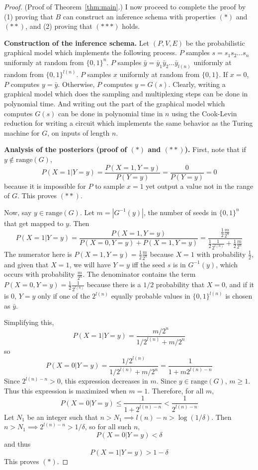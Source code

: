 \documentclass{article}
\theoremstyle{definition}
\theoremstyle{remark}
\begin{document}
\begin{proof}{(Proof of Theorem~\ref{thm:main}.)}
I now proceed to complete the proof by (1) proving that $B$ can construct an inference schema with properties $(*)$ and $(**)$, and (2) proving that $(***)$ holds.

\medskip
\noindent \textbf{Construction of the inference schema.}
Let $(P, V, E)$ be the probabilistic graphical model which implements the following process.
$P$ samples $s = s_1 s_2 \dots s_n$ uniformly at random from $\{0, 1\}^n$.
$P$ samples $\bar{y} = \bar{y}_1 \bar{y}_2 \dots \bar{y}_{l(n)}$ uniformly at random from $\{0, 1\}^{l(n)}$.
$P$ samples $x$ uniformly at random from $\{0, 1\}$.
If $x = 0$, $P$ computes $y = \bar{y}$.
Otherwise, $P$ computes $y = G(s)$.
Clearly, writing a graphical model which does the sampling and multiplexing steps can be done in polynomial time.
And writing out the part of the graphical model which computes $G(s)$ can be done in polynomial time in $n$ using the Cook-Levin reduction for writing a circuit which implements the same behavior as the Turing machine for $G$, on inputs of length $n$.

\medskip
\noindent \textbf{Analysis of the posteriors (proof of $(*)$ and $(**)$).}
First, note that if $y \notin \text{range}(G)$,
$$
P(X = 1 | Y = y) = \frac{P(X = 1, Y = y)}{P(Y = y)} = \frac{0}{P(Y = y)} = 0
$$
because it is impossible for $P$ to sample $x = 1$ yet output a value not in the range of $G$.
This proves $(**)$.

Now, say $y \in \text{range}(G)$.
Let $m = |G^{-1}(y)|$, the number of seeds in $\{0, 1\}^n$ that get mapped to $y$.
Then
$$
P(X = 1 | Y = y) = \frac{P(X = 1, Y = y)}{P(X = 0, Y = y) + P(X = 1, Y = y)}
= \frac{
    \frac{1}{2} \frac{m}{2^n}
}{
    \frac{1}{2} \frac{1}{2^{l(n)}} + \frac{1}{2} \frac{m}{2^n}
}
$$
The numerator here is $P(X = 1, Y = y) = \frac{1}{2} \frac{m}{2^n}$ 
because $X = 1$ with probability $\frac{1}{2}$, and given that $X = 1$, we will have $Y = y$ iff the seed $s$ is in $G^{-1}(y)$, which occurs with probability $\frac{m}{2^n}$.
The denominator contains the term $P(X = 0, Y = y) = \frac{1}{2} \frac{1}{2^{l(n)}}$ because there is a $1/2$ probability that $X = 0$, and if it is $0$, $Y = y$ only if one of the $2^{l(n)}$ equally probable values in $\{0, 1\}^{l(n)}$ is chosen as $\bar{y}$.

Simplifying this, 
$$
P(X = 1 | Y = y) = \frac{
    m/2^n
}{
    1/2^{l(n)} + m/2^n
}
$$
so
$$
P(X = 0 | Y = y) = \frac{
    1/2^{l(n)}
}{
    1/2^{l(n)} + m/2^n
} = \frac{1}{1 + m 2^{l(n) - n}}
$$
Since $2^{l(n) - n} > 0$, this expression decreases in $m$.
Since $y \in \text{range}(G)$, $m \geq 1$.
Thus this expression is maximized when $m = 1$.
Therefore, for all $m$,
$$
P(X = 0 | Y = y) \leq \frac{1}{1 + 2^{l(n) - n}} < \frac{1}{2^{l(n) - n}}
$$
Let $N_1$ be an integer such that
$n > N_1 \implies l(n) - n > \log(1/\delta)$.
Then $n > N_1 \implies 2^{l(n) - n} > 1/\delta$,
so for all such $n$,
$$
P(X = 0 | Y = y) < \delta
$$
and thus
$$
P(X = 1 | Y = y) > 1 - \delta
$$
This proves $(*)$.


\end{proof}
\end{document}
